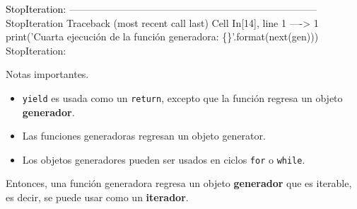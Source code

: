 \documentclass[
  spanish,
  letterpaper,
]{scrbook}
\providecommand{\tightlist}{%
  \setlength{\itemsep}{0pt}\setlength{\parskip}{0pt}}
\theoremstyle{definition}
\theoremstyle{remark}
\begin{document}
\begin{Highlighting}
\textcolor{black}{StopIteration: }
\textcolor{black}{}\textcolor{QuartoInternalColor1}{---------------------------------------------------------------------------}\textcolor{QuartoInternalColor2}{}
\textcolor{QuartoInternalColor2}{}\textcolor{QuartoInternalColor1}{StopIteration}\textcolor{QuartoInternalColor2}{                             Traceback (most recent call last)}
\textcolor{QuartoInternalColor2}{}\textcolor{QuartoInternalColor3}{Cell}\textcolor{QuartoInternalColor2}{}\textcolor{QuartoInternalColor3}{ }\textcolor{QuartoInternalColor2}{}\textcolor{QuartoInternalColor4}{In[14]}\textcolor{QuartoInternalColor2}{}\textcolor{QuartoInternalColor4}{, line 1}\textcolor{QuartoInternalColor2}{}
\textcolor{QuartoInternalColor2}{}\textcolor{QuartoInternalColor4}{----> }\textcolor{QuartoInternalColor2}{}\textcolor{QuartoInternalColor4}{1}\textcolor{QuartoInternalColor2}{ }\textcolor{QuartoInternalColor5}{print}\textcolor{QuartoInternalColor2}{(}\textcolor{QuartoInternalColor6}{'}\textcolor{QuartoInternalColor2}{}\textcolor{QuartoInternalColor6}{Cuarta ejecución de la función generadora: }\textcolor{QuartoInternalColor2}{}\textcolor{QuartoInternalColor8}{\{\}}\textcolor{QuartoInternalColor2}{}\textcolor{QuartoInternalColor6}{'}\textcolor{QuartoInternalColor2}{.format(}\textcolor{QuartoInternalColor5}{next}\textcolor{QuartoInternalColor2}{}\textcolor{QuartoInternalColor2}{(}\textcolor{QuartoInternalColor2}{}\textcolor{QuartoInternalColor2}{gen}\textcolor{QuartoInternalColor2}{}\textcolor{QuartoInternalColor2}{)}\textcolor{QuartoInternalColor2}{))}
\textcolor{QuartoInternalColor2}{}\textcolor{QuartoInternalColor1}{StopIteration}\textcolor{QuartoInternalColor2}{: }
\end{Highlighting}

Notas importantes.

\begin{itemize}
\tightlist
\item
  \texttt{yield} es usada como un \texttt{return}, excepto que la
  función regresa un objeto \textbf{generador}.
\item
  Las funciones generadoras regresan un objeto generator.
\item
  Los objetos generadores pueden ser usados en ciclos \texttt{for} o
  \texttt{while}.
\end{itemize}

Entonces, una función generadora regresa un objeto \textbf{generador}
que es iterable, es decir, se puede usar como un \textbf{iterador}.
\end{document}
